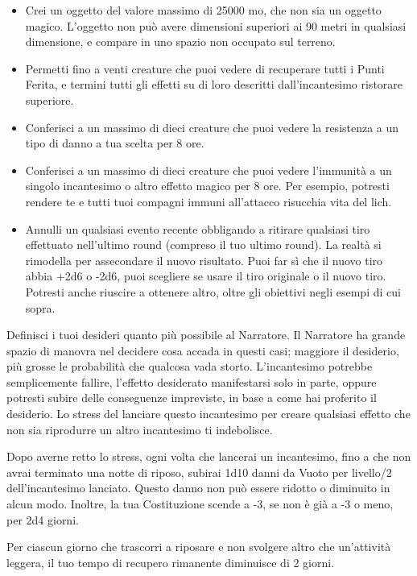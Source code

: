 \begin{multicols}{2}
\begin{itemize}[leftmargin=*] \setlength{\itemsep}{0pt}
	\item Crei un oggetto del valore massimo di 25000 mo, che non sia un oggetto magico. L'oggetto non può avere dimensioni superiori ai 90 metri in qualsiasi dimensione, e compare in uno spazio non occupato sul terreno.
	\item Permetti fino a venti creature che puoi vedere di recuperare tutti i Punti Ferita, e termini tutti gli effetti su di loro descritti dall'incantesimo ristorare superiore.
	\item Conferisci a un massimo di dieci creature che puoi vedere la resistenza a un tipo di danno a tua scelta per 8 ore.
	\item Conferisci a un massimo di dieci creature che puoi vedere l'immunità a un singolo incantesimo o altro effetto magico per 8 ore. Per esempio, potresti rendere te e tutti tuoi compagni immuni all'attacco risucchia vita del lich.
	\item Annulli un qualsiasi evento recente obbligando a ritirare qualsiasi tiro effettuato nell'ultimo round (compreso il tuo ultimo round). La realtà si rimodella per assecondare il nuovo risultato. Puoi far sì che il nuovo tiro abbia +2d6 o -2d6, puoi scegliere se usare il tiro originale o il nuovo tiro. Potresti anche riuscire a ottenere altro, oltre gli obiettivi negli esempi di cui sopra.
\end{itemize}

\medskip
Definisci i tuoi desideri quanto più possibile al Narratore. Il Narratore ha grande spazio di manovra nel decidere cosa accada in questi casi; maggiore il desiderio, più grosse le probabilità che qualcosa vada storto. L'incantesimo potrebbe semplicemente fallire, l'effetto desiderato manifestarsi solo in parte, oppure potresti subire delle conseguenze impreviste, in base a come hai proferito il desiderio. Lo stress del lanciare questo incantesimo per creare qualsiasi effetto che non sia riprodurre un altro incantesimo ti indebolisce.

Dopo averne retto lo stress, ogni volta che lancerai un incantesimo, fino a che non avrai terminato una notte di riposo, subirai 1d10 danni da Vuoto per livello/2 dell'incantesimo lanciato. Questo danno non può essere ridotto o diminuito in alcun modo. Inoltre, la tua Costituzione scende a -3, se non è già a -3 o meno, per 2d4 giorni.

Per ciascun giorno che trascorri a riposare e non svolgere altro che un'attività leggera, il tuo tempo di recupero rimanente diminuisce di 2 giorni.


\end{multicols}
